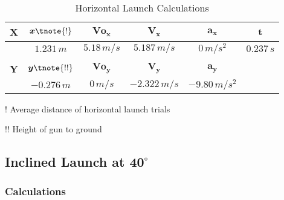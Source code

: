 \begin{table}[H]
\centering
\begin{threeparttable}
\begin{tabular}{cccccc}
	\textbf{X} & $\boldsymbol{x}\tnote{!}$ & $\boldsymbol{V\!o_x}$ & $\boldsymbol{V_x}$ & $\boldsymbol{a_x}$ & $\boldsymbol{t}$ \\ \hline
 & $1.231\,m$ & $5.18\,m/s$ & $5.187\,m/s$ & $0\,m/s^2$ & $0.237\,s$ \\
\multicolumn{1}{l}{} & \multicolumn{1}{l}{} & \multicolumn{1}{l}{} & \multicolumn{1}{l}{} & \multicolumn{1}{l}{} & \multicolumn{1}{l}{} \\
\textbf{Y} & $\boldsymbol{y}\tnote{!!} $ & $\boldsymbol{V\!o_y}$ & $\boldsymbol{V_y}$ & $\boldsymbol{a_y}$ &  \\ \hline
 & $-0.276\,m$ & $0\,m/s$ & $-2.322\,m/s$ & $-9.80\,m/s^2$ &
\end{tabular}
\begin{tablenotes}\footnotesize
	\item[!] Average distance of horizontal launch trials
	\item[!!] Height of gun to ground
\end{tablenotes}	
\end{threeparttable}
\caption{Horizontal Launch Calculations}
\label{tab:HLc}
\end{table}

\subsection{Inclined Launch at $\boldsymbol{40^\circ}$}


\subsubsection{Calculations}

